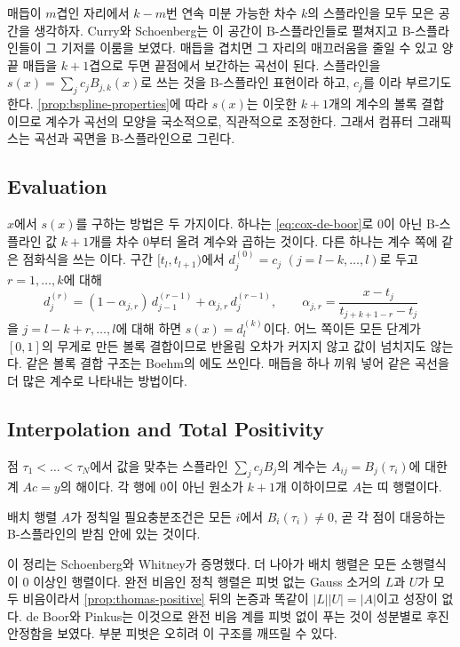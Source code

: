 매듭이 $m$겹인 자리에서 $k-m$번 연속 미분 가능한 차수 $k$의 스플라인을 모두 모은 공간을 생각하자. Curry와 Schoenberg는 이 공간이 B-스플라인들로 펼쳐지고 B-스플라인들이 그 기저를 이룸을 보였다\cite{curry1966}. 매듭을 겹치면 그 자리의 매끄러움을 줄일 수 있고 양 끝 매듭을 $k+1$겹으로 두면 끝점에서 보간하는 곡선이 된다. 스플라인을 $s(x)=\sum_jc_jB_{j,k}(x)$로 쓰는 것을 B-스플라인 표현이라 하고, $c_j$를 이라 부르기도 한다. \cref{prop:bspline-properties}에 따라 $s(x)$는 이웃한 $k+1$개의 계수의 볼록 결합이므로 계수가 곡선의 모양을 국소적으로, 직관적으로 조정한다. 그래서 컴퓨터 그래픽스는 곡선과 곡면을 B-스플라인으로 그린다.

\subsection{Evaluation}

$x$에서 $s(x)$를 구하는 방법은 두 가지이다. 하나는 \eqref{eq:cox-de-boor}로 $0$이 아닌 B-스플라인 값 $k+1$개를 차수 $0$부터 올려 계수와 곱하는 것이다. 다른 하나는 계수 쪽에 같은 점화식을 쓰는 이다. 구간 $[t_l,t_{l+1})$에서 $d_j^{(0)}=c_j$ $(j=l-k,\dots,l)$로 두고 $r=1,\dots,k$에 대해
\[
d_j^{(r)}=(1-\alpha_{j,r})\,d_{j-1}^{(r-1)}+\alpha_{j,r}\,d_j^{(r-1)},\qquad\alpha_{j,r}=\frac{x-t_j}{t_{j+k+1-r}-t_j}
\]
을 $j=l-k+r,\dots,l$에 대해 하면 $s(x)=d_l^{(k)}$이다. 어느 쪽이든 모든 단계가 $[0,1]$의 무게로 만든 볼록 결합이므로 반올림 오차가 커지지 않고 값이 넘치지도 않는다. 같은 볼록 결합 구조는 Boehm의 에도 쓰인다\cite{boehm1980}. 매듭을 하나 끼워 넣어 같은 곡선을 더 많은 계수로 나타내는 방법이다.

\subsection{Interpolation and Total Positivity}

점 $\tau_1<\dots<\tau_N$에서 값을 맞추는 스플라인 $\sum_jc_jB_j$의 계수는  $A_{ij}=B_j(\tau_i)$에 대한 계 $Ac=y$의 해이다. 각 행에 $0$이 아닌 원소가 $k+1$개 이하이므로 $A$는 띠 행렬이다.

\begin{theorem}
\label{thm:schoenberg-whitney}
배치 행렬 $A$가 정칙일 필요충분조건은 모든 $i$에서 $B_i(\tau_i)\ne0$, 곧 각 점이 대응하는 B-스플라인의 받침 안에 있는 것이다.
\end{theorem}

이 정리는 Schoenberg와 Whitney가 증명했다\cite{schoenberg1953whitney}. 더 나아가 배치 행렬은 모든 소행렬식이 $0$ 이상인  행렬이다\cite{karlin1968,deboor2001guide}. 완전 비음인 정칙 행렬은 피벗 없는 Gauss 소거의 $L$과 $U$가 모두 비음이라서 \cref{prop:thomas-positive} 뒤의 논증과 똑같이 $|L||U|=|A|$이고 성장이 없다. de Boor와 Pinkus는 이것으로 완전 비음 계를 피벗 없이 푸는 것이 성분별로 후진 안정함을 보였다\cite{deboor1977pinkus}. 부분 피벗은 오히려 이 구조를 깨뜨릴 수 있다.

